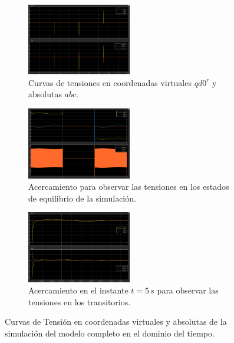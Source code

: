 \documentclass{article}
\begin{document}
\begin{figure}[H]
    \centering
    \begin{subfigure}[t]{\textwidth}
        \centering
        \includegraphics[width=0.5\textwidth]{Imagenes/TensionesSimulacionCompleta.png}
        \caption{Curvas de tensiones en coordenadas virtuales \(qd0^r\) y absolutas \(abc\).}
        \label{fig:TensionesSimulacionCompleta}
    \end{subfigure}
    
    \vspace{0.5cm} %
    
    \begin{subfigure}[t]{\textwidth}
        \centering
        \includegraphics[width=0.5\textwidth]{Imagenes/AcercamientoTensionesEstacionariasSimulacion.png}
        \caption{Acercamiento para observar las tensiones en los estados de equilibrio de la simulación.}
        \label{fig:AcercamientoTensionesEstacionariasSimulacion}
    \end{subfigure}

    \vspace{0.5cm} %
    
    \begin{subfigure}[t]{\textwidth}
        \centering
        \includegraphics[width=0.5\textwidth]{Imagenes/AcercamientoTensionesTransitoriosSimulacion.png}
        \caption{Acercamiento en el instante \(t = 5\,s\) para observar las tensiones en los transitorios.}
        \label{fig:AcercamientoTensionesTransitoriosSimulacion}
    \end{subfigure}
    \caption{Curvas de Tensión en coordenadas virtuales y absolutas de la simulación del modelo completo en el dominio del tiempo.}
    \label{fig:TensionesSimulacionCompleta}
\end{figure}
\end{document}
